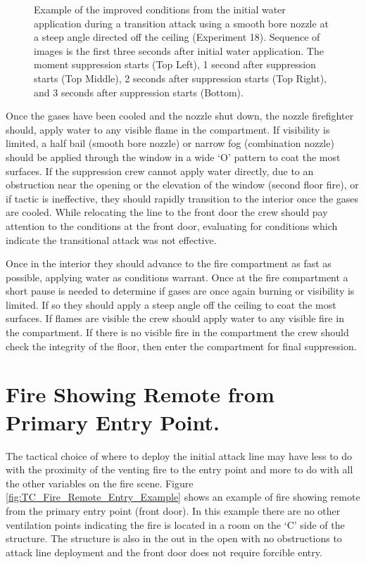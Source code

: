 \documentclass[12pt,oneside]{book}
\begin{document}
\begin{figure}[H]
\caption[Transitional Attack - Example of Positive Impact on Conditions]{Example of the improved conditions from the initial water application during a transition attack using a smooth bore nozzle at a steep angle directed off the ceiling (Experiment 18). Sequence of images is the first three seconds after initial water application. The moment suppression starts (Top Left), 1 second after suppression starts (Top Middle), 2 seconds after suppression starts (Top Right), and 3 seconds after suppression starts (Bottom).}
\label{fig:TC_effective_initial_application}
\end{figure} 

Once the gases have been cooled and the nozzle shut down, the nozzle firefighter should, apply water to any visible flame in the compartment. If visibility is limited, a half bail (smooth bore nozzle) or narrow fog (combination nozzle) should be applied through the window in a wide `O' pattern to coat the most surfaces. If the suppression crew cannot apply water directly, due to an obstruction near the opening or the elevation of the window (second floor fire), or if tactic is ineffective, they should rapidly transition to the interior once the gases are cooled. While relocating the line to the front door the crew should pay attention to the conditions at the front door, evaluating for conditions which indicate the transitional attack was not effective.

Once in the interior they should advance to the fire compartment as fast as possible, applying water as conditions warrant. Once at the fire compartment a short pause is needed to determine if gases are once again burning or visibility is limited. If so they should apply a steep angle off the ceiling to coat the most surfaces. If flames are visible the crew should apply water to any visible fire in the compartment. If there is no visible fire in the compartment the crew should check the integrity of the floor, then enter the compartment for final suppression. 

\section{Fire Showing Remote from Primary Entry Point.}
The tactical choice of where to deploy the initial attack line may have less to do with the proximity of the venting fire to the entry point and more to do with all the other variables on the fire scene. Figure \ref{fig:TC_Fire_Remote_Entry_Example} shows an example of fire showing remote from the primary entry point (front door). In this example there are no other ventilation points indicating the fire is located in a room on the `C' side of the structure. The structure is also in the out in the open with no obstructions to attack line deployment and the front door does not require forcible entry. 
\end{document}
